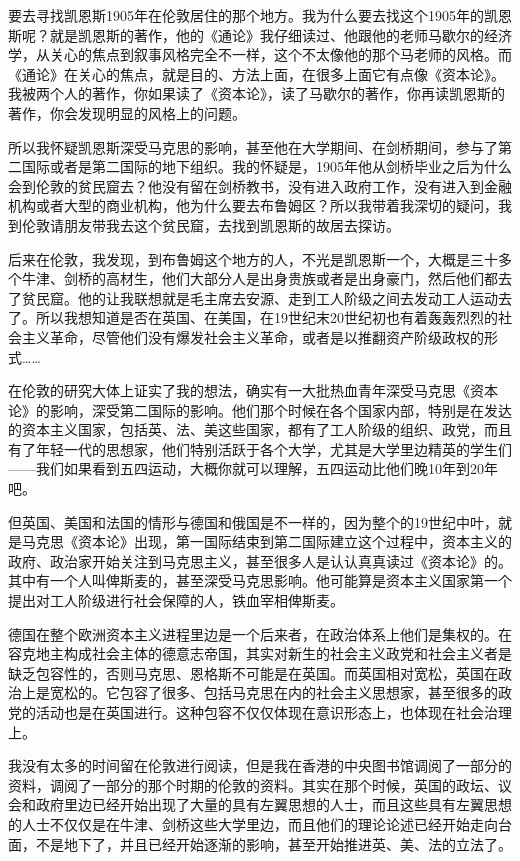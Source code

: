 \documentclass[UTF8, 12pt, a4paper]{ctexrep}
\begin{document}
要去寻找凯恩斯1905年在伦敦居住的那个地方。我为什么要去找这个1905年的凯恩斯呢？就是凯恩斯的著作，他的《通论》我仔细读过、他跟他的老师马歇尔的经济学，从关心的焦点到叙事风格完全不一样，这个不太像他的那个马老师的风格。而《通论》在关心的焦点，就是目的、方法上面，在很多上面它有点像《资本论》。我被两个人的著作，你如果读了《资本论》，读了马歇尔的著作，你再读凯恩斯的著作，你会发现明显的风格上的问题。

所以我怀疑凯恩斯深受马克思的影响，甚至他在大学期间、在剑桥期间，参与了第二国际或者是第二国际的地下组织。我的怀疑是，1905年他从剑桥毕业之后为什么会到伦敦的贫民窟去？他没有留在剑桥教书，没有进入政府工作，没有进入到金融机构或者大型的商业机构，他为什么要去布鲁姆区？所以我带着我深切的疑问，我到伦敦请朋友带我去这个贫民窟，去找到凯恩斯的故居去探访。

后来在伦敦，我发现，到布鲁姆这个地方的人，不光是凯恩斯一个，大概是三十多个牛津、剑桥的高材生，他们大部分人是出身贵族或者是出身豪门，然后他们都去了贫民窟。他的让我联想就是毛主席去安源、走到工人阶级之间去发动工人运动去了。所以我想知道是否在英国、在美国，在19世纪末20世纪初也有着轰轰烈烈的社会主义革命，尽管他们没有爆发社会主义革命，或者是以推翻资产阶级政权的形式……

在伦敦的研究大体上证实了我的想法，确实有一大批热血青年深受马克思《资本论》的影响，深受第二国际的影响。他们那个时候在各个国家内部，特别是在发达的资本主义国家，包括英、法、美这些国家，都有了工人阶级的组织、政党，而且有了年轻一代的思想家，他们特别活跃于各个大学，尤其是大学里边精英的学生们——我们如果看到五四运动，大概你就可以理解，五四运动比他们晚10年到20年吧。

但英国、美国和法国的情形与德国和俄国是不一样的，因为整个的19世纪中叶，就是马克思《资本论》出现，第一国际结束到第二国际建立这个过程中，资本主义的政府、政治家开始关注到马克思主义，甚至很多人是认认真真读过《资本论》的。其中有一个人叫俾斯麦的，甚至深受马克思影响。他可能算是资本主义国家第一个提出对工人阶级进行社会保障的人，铁血宰相俾斯麦。

德国在整个欧洲资本主义进程里边是一个后来者，在政治体系上他们是集权的。在容克地主构成社会主体的德意志帝国，其实对新生的社会主义政党和社会主义者是缺乏包容性的，否则马克思、恩格斯不可能是在英国。而英国相对宽松，英国在政治上是宽松的。它包容了很多、包括马克思在内的社会主义思想家，甚至很多的政党的活动也是在英国进行。这种包容不仅仅体现在意识形态上，也体现在社会治理上。

我没有太多的时间留在伦敦进行阅读，但是我在香港的中央图书馆调阅了一部分的资料，调阅了一部分的那个时期的伦敦的资料。其实在那个时候，英国的政坛、议会和政府里边已经开始出现了大量的具有左翼思想的人士，而且这些具有左翼思想的人士不仅仅是在牛津、剑桥这些大学里边，而且他们的理论论述已经开始走向台面，不是地下了，并且已经开始逐渐的影响，甚至开始推进英、美、法的立法了。
\end{document}
